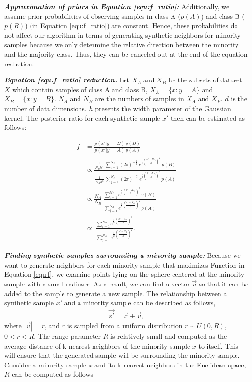 \textbf{\textit{Approximation of priors in Equation \ref{equ:f_ratio}:}} Additionally, we assume prior probabilities of observing samples in class A ($p(A)$) and class B ($p(B)$) (in Equation \ref{equ:f_ratio}) are constant. Hence, these probabilities do not affect our algorithm in terms of generating synthetic neighbors for minority samples because we only determine the relative direction between the minority and the majority class. Thus, they can be canceled out at the end of the equation reduction. 

\textbf{\textit{Equation \ref{equ:f_ratio} reduction:} } Let $X_A$ and $X_B$ be the subsets of dataset $X$ which contain samples of class A and class B, $X_A=\{x: y=A  \}$ and $X_B=\{x: y=B  \}$. $N_A$ and $N_B$ are the numbers of samples in $X_A$ and $X_B$. $d$ is the number of data dimensions. $h$ presents the width parameter of the Gaussian kernel. The posterior ratio for each synthetic sample $x'$ then can be estimated as follows:

\begin{align}
	\label{eq:fracpost_estimation}
	f &= \frac{p(x'|y'=B)  \: p(B)}{p(x'|y'=A) \: p(A)} \\
	&\propto \frac{ \frac{1}{N_B h^d} \: \sum_{i=1}^{N_B}{ (2\pi)^{-\frac{d}{2}} \: e^{\frac{1}{2}{(\frac{x'-X_{B_i}}{h})^2} } } \: p(B) }
	{ \frac{1}{N_A h^d} \:  \sum_{j=1}^{N_A}{ (2\pi)^{-\frac{d}{2}} \: e^{ \frac{1}{2} {(\frac{x-X_{A_j}}{h})^2} } }\: p(A) }\\
	&\propto \frac{N_A}{N_B} \: \frac{ \sum_{i=1}^{N_B}{ e^{\frac{1}{2}{(\frac{x'-X_{B_i}}{h})^2} } } \: p(B)}
	{  \sum_{j=1}^{N_A}{ e^{ \frac{1}{2} {(\frac{x'-X_{A_j}}{h})^2} } } \: p(A)} \label{equ:f_}\\
	&\propto  \: \frac{ \sum_{i=1}^{N_B}{ e^{\frac{1}{2}{(\frac{x'-X_{B_i}}{h})^2} } }}
	{  \sum_{j=1}^{N_A}{ e^{ \frac{1}{2} {(\frac{x'-X_{A_j}}{h})^2} } } } \label{equ:f}.
\end{align} 


\textbf{\textit{Finding synthetic samples surrounding a minority sample:}} Because we want to generate neighbors for each minority sample that maximizes Function  in Equation \ref{equ:f}, we examine points lying on the sphere centered at the minority sample with a small radius $r$. As a result, we can find a vector $\vec{v}$ so that it can be added to the sample to generate a new sample. The relationship between a synthetic sample $x'$ and a minority sample can be described as follows,
\begin{align}
	\label{equ:vecV}
	\vec{x'} =  \vec{x} + \vec{v},
\end{align}
where $|\vec{v}| = r $, and $r$ is sampled from a uniform distribution $r \sim U(0,R)$, $0<r<R$. The range parameter $R$ is relatively small and computed as the average distance of k-nearest neighbors of the minority sample $x$ to itself. This will ensure that the generated sample will be surrounding the minority sample. Consider a minority sample $x$ and its k-nearest neighbors in the Euclidean space, $R$ can be computed as follows:

